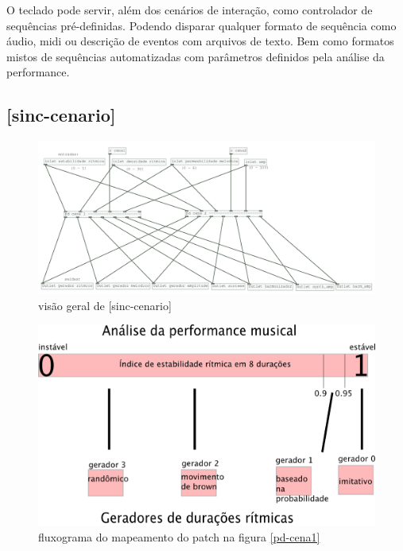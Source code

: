 \documentclass[draft]{ppgmus}
\begin{document}
O teclado pode servir, além dos cenários de interação, como controlador
de sequências pré-definidas. Podendo disparar qualquer formato de sequência como
áudio, midi ou descrição de eventos com arquivos de texto. Bem como formatos mistos
de sequências automatizadas com parâmetros definidos pela análise da performance.



\subsection{[sinc-cenario]}

\begin{figure}
\includegraphics[scale=.4]{sinc-cenario}
\caption{visão geral de [sinc-cenario]}
\label{sinc-cenario}
\end{figure}

\begin{figure}
\includegraphics[scale=.4]{tabela-cenario}
\caption{fluxograma do mapeamento do patch na figura \ref{pd-cena1}}
\label{tabela-cenario}
\end{figure}
\end{document}

